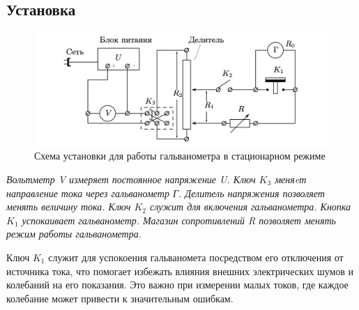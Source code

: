 \documentclass[a4paper,12pt]{article} %
\begin{document}
\subsection{Установка}
\begin{figure}[h!]
    \centering
    \includegraphics[width=0.8\linewidth]{Снимок экрана 2024-11-15 в 21.42.32.png}
    \caption{Схема установки для работы гальванометра в стационарном режиме}
    \label{sheme_1}
\end{figure}
\begin{centering}
\textit{Вольтметр V измеряет постоянное напряжение U. Ключ $K_3$ меняeт направление тока через гальванометр Г. Делитель напряжения позволяет менять величину тока. Ключ $K_2$ служит для включения гальванометра. Кнопка $K_1$ успокаивает гальванометр. Магазин сопротивлений R позволяет менять режим работы гальванометра.}
\end{centering}
\newline
\newline
Ключ $K_1$ служит для успокоения гальваномета посредством его отключения от источника тока, что помогает избежать влияния внешних электрических шумов и колебаний на его показания. Это важно при измерении малых токов, где каждое колебание может привести к значительным ошибкам. 
\newpage
\end{document}
